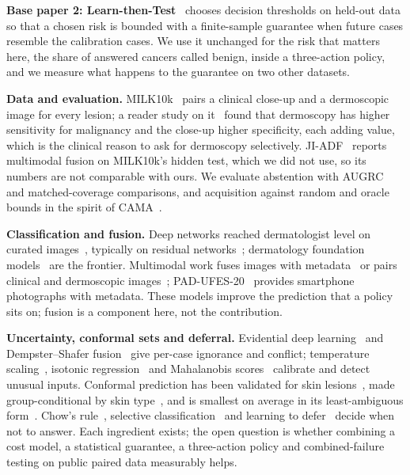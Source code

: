 \documentclass[conference]{IEEEtran}
\begin{document}
\textbf{Base paper 2: Learn-then-Test}~\cite{r3} chooses decision thresholds on held-out data so that a chosen risk is bounded with a finite-sample guarantee when future cases resemble the calibration cases. We use it unchanged for the risk that matters here, the share of answered cancers called benign, inside a three-action policy, and we measure what happens to the guarantee on two other datasets.

\textbf{Data and evaluation.} MILK10k~\cite{r4} pairs a clinical close-up and a dermoscopic image for every lesion; a reader study on it~\cite{r5} found that dermoscopy has higher sensitivity for malignancy and the close-up higher specificity, each adding value, which is the clinical reason to ask for dermoscopy selectively. JI-ADF~\cite{r6} reports multimodal fusion on MILK10k's hidden test, which we did not use, so its numbers are not comparable with ours. We evaluate abstention with AUGRC~\cite{r7} and matched-coverage comparisons, and acquisition against random and oracle bounds in the spirit of CAMA~\cite{r8}.

\textbf{Classification and fusion.} Deep networks reached dermatologist level on curated images~\cite{r1}, typically on residual networks~\cite{r9}; dermatology foundation models~\cite{r10} are the frontier. Multimodal work fuses images with metadata~\cite{r11} or pairs clinical and dermoscopic images~\cite{r12}; PAD-UFES-20~\cite{r13} provides smartphone photographs with metadata. These models improve the prediction that a policy sits on; fusion is a component here, not the contribution.

\textbf{Uncertainty, conformal sets and deferral.} Evidential deep learning~\cite{r14} and Dempster--Shafer fusion~\cite{r15,r16} give per-case ignorance and conflict; temperature scaling~\cite{r17}, isotonic regression~\cite{r18} and Mahalanobis scores~\cite{r19} calibrate and detect unusual inputs. Conformal prediction has been validated for skin lesions~\cite{r20}, made group-conditional by skin type~\cite{r21}, and is smallest on average in its least-ambiguous form~\cite{r22}. Chow's rule~\cite{r23}, selective classification~\cite{r24} and learning to defer~\cite{r25} decide when not to answer. Each ingredient exists; the open question is whether combining a cost model, a statistical guarantee, a three-action policy and combined-failure testing on public paired data measurably helps.
\end{document}
